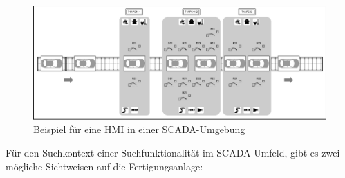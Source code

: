 \begin{figure}[H]
    \centering
    \includegraphics[width=0.8\linewidth]{images/2D_Visu.png}
    \caption{Beispiel für eine HMI in einer SCADA-Umgebung}
    \label{fig:2D_Visu}
\end{figure}

Für den Suchkontext einer Suchfunktionalität im SCADA-Umfeld, gibt es zwei mögliche Sichtweisen auf die Fertigungsanlage:

